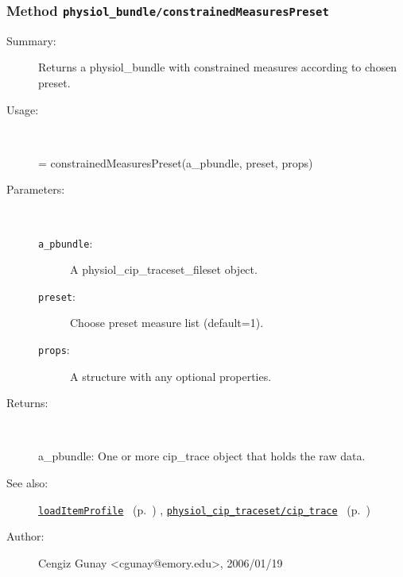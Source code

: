 \subsubsection[Method \texttt{constrainedMeasuresPreset}]{Method \texttt{physiol\_bundle/constrainedMeasuresPreset}}%
%
\label{ref_physiol_bundle__constrainedMeasuresPreset}%
\hypertarget{ref_physiol_bundle__constrainedMeasuresPreset}{}%
\begin{description}
\item[Summary:]Returns a physiol\_bundle with constrained measures according to chosen preset.
%
\item[Usage:]~%
\begin{lyxcode}%
[a\_pbundle test\_names] = constrainedMeasuresPreset(a\_pbundle, preset, props)
%
\end{lyxcode}%
%
%
\item[Parameters:]~
\begin{description}%
\item[\texttt{a\_pbundle}:]
 A physiol\_cip\_traceset\_fileset object.
\item[\texttt{preset}:]
 Choose preset measure list (default=1).
\item[\texttt{props}:]
 A structure with any optional properties.
\end{description}%
%
\item[Returns:
]~

	a\_pbundle: One or more cip\_trace object that holds the raw data.
%
%
\item[See also:]%
\hyperlink{ref_loadItemProfile}{\texttt{loadItemProfile}}%
\ (p.~\pageref{ref_loadItemProfile})%
%
, \hyperlink{ref_physiol_cip_traceset__cip_trace}{\texttt{physiol\_cip\_traceset/cip\_trace}}%
\ (p.~\pageref{ref_physiol_cip_traceset__cip_trace})%
%
%
\item[Author:]%
Cengiz Gunay <cgunay@emory.edu>, 2006/01/19
%
\end{description}
\methodline%

